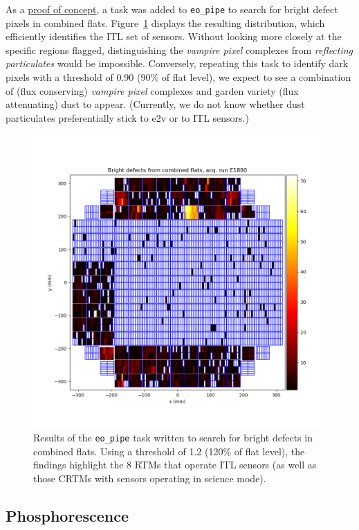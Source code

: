 As a \href{https://rubin-obs.slack.com/archives/C07QJMQAP6E/p1731348605966989?thread_ts=1730921120.364949&cid=C07QJMQAP6E}{proof of concept}, a task was added to {\tt eo\_pipe} to search for bright defect pixels in combined flats. Figure~\ref{fig:eopipe_brightdefects_task_result} displays the resulting distribution, which efficiently identifies the ITL set of sensors. Without looking more closely at the specific regions flagged, distinguishing the {\it vampire pixel} complexes from {\it reflecting particulates} would be impossible. Conversely, repeating this task to identify dark pixels with a threshold of 0.90 (90\% of flat level), we expect to see a combination of (flux conserving) {\it vampire pixel} complexes and garden variety (flux attenuating) dust to appear. (Currently, we do not know whether dust particulates preferentially stick to e2v or to ITL sensors.)

\begin{figure}[ht]
    \centering
    \includegraphics[width=0.75\linewidth]{figures/vamp_desc/vampire_defects_fp_plot_LSSTCam_u_jchiang_eo_vampire_defects_E1880_w_2024_35_20241111T173034Z.png}
    \caption{Results of the {\tt eo\_pipe} task written to search for bright defects in combined flats. Using a threshold of 1.2 (120\% of flat level), the findings highlight the 8 RTMs that operate ITL sensors (as well as those CRTMs with sensors operating in science mode).}
    \label{fig:eopipe_brightdefects_task_result}
\end{figure}



\clearpage

\subsection{Phosphorescence}\label{phosphorescence}

